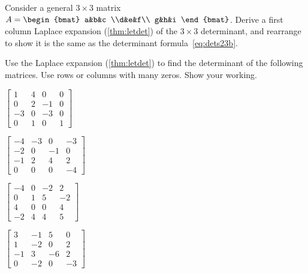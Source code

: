 \begin{exercise}  
Consider a general \(3\times3\) matrix \(A=\begin{bmat} a&b&c \\d&e&f\\ g&h&i \end{bmat}\).
Derive a first column Laplace expansion (\cref{thm:letdet}) of the \(3\times3\) determinant, and rearrange to show it is the same as the determinant formula~\eqref{eq:dets23b}.
\end{exercise}





\begin{exercise}  
Use the Laplace expansion (\cref{thm:letdet}) to find the determinant of the following matrices.  
Use rows or columns with many zeros.
Show your working.
\begin{Parts}
\item \(\begin{bmatrix} 1 & 4 & 0 & 0
\\0 & 2 & -1 & 0
\\-3 & 0 & -3 & 0
\\0 & 1 & 0 & 1 \end{bmatrix}\)

\item \(\begin{bmatrix} -4 & -3 & 0 & -3
\\-2 & 0 & -1 & 0
\\-1 & 2 & 4 & 2
\\0 & 0 & 0 & -4 \end{bmatrix}\)

\begin{OmitV1}
\item \(\begin{bmatrix} -4 & 0 & -2 & 2
\\0 & 1 & 5 & -2
\\4 & 0 & 0 & 4
\\-2 & 4 & 4 & 5 \end{bmatrix}\)

\item \(\begin{bmatrix} 3 & -1 & 5 & 0
\\1 & -2 & 0 & 2
\\-1 & 3 & -6 & 2
\\0 & -2 & 0 & -3 \end{bmatrix}\)


\end{OmitV1}
\end{Parts}
\end{exercise}
